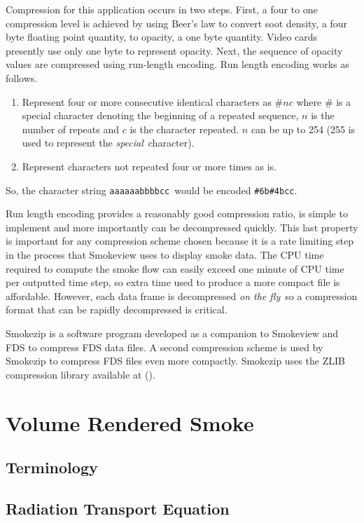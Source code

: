Compression for this application occurs in two steps.  First, a
four to one compression level is achieved by using Beer's law to
convert soot density, a four byte floating point quantity, to
opacity, a one byte quantity.  Video cards presently use only one
byte to represent opacity. Next, the sequence of opacity values
are compressed using run-length encoding. Run length encoding
works as follows.

\begin{enumerate}
\item Represent four or more consecutive identical characters as
$\# n c$ where $\#$ is a special character denoting the beginning
of a repeated sequence, $n$ is the number of repeats and $c$ is
the character repeated.  $n$ can be up to 254 (255 is used to
represent the {\em special}\ character). \item Represent
characters not repeated four or more times as is.
\end{enumerate}

So, the character string {\tt aaaaaabbbbcc}\ would be encoded {\tt \#6b\#4bcc}.

Run length encoding provides a reasonably good compression ratio,
is simple to implement and more importantly can be decompressed
quickly. This last property is important for any compression
scheme chosen because it is a rate limiting step in the process
that Smokeview uses to display smoke data. The CPU time required
to compute the smoke flow can easily exceed one minute of CPU time
per outputted time step, so extra time used to produce a more
compact file is affordable. However, each data frame is
decompressed {\em on the fly}\ so a compression format that can be
rapidly decompressed is critical.

Smokezip is a software program developed as a companion to
Smokeview and FDS to compress FDS data files. A second compression
scheme is used by Smokezip to compress FDS files even more
compactly.  Smokezip uses the ZLIB compression library available
at ().

\section{Volume Rendered Smoke}
\subsection{Terminology}
\subsection{Radiation Transport Equation}
\newcommand{\siga}{ \sigma_a(x) }
\newcommand{\sigt}{ \sigma_t(x) }
\newcommand{\sigs}{ \sigma_s(x) }
\newcommand{\sigts}{ \sigma_t(s) }
\newcommand{\Le}{ L_e(x) }
\newcommand{\Lexo}{ L_e(x,\omega) }
\newcommand{\Lxo}{ L(x,\omega) }
\newcommand{\dLdx}{ \frac{dL}{dx}(x)}
\newcommand{\intf}[2]{ \exp\left({\int_#1^#2 \sigts ds}\right) }
\newcommand{\intff}[2]{ {\int_#1^#2 \sigts ds} }
\newcommand{\intmf}[2]{ \exp\left({-\int_#1^#2 \sigts ds}\right) }
\newcommand{\intmff}[2]{ {-\int_#1^#2 \sigts ds} }

